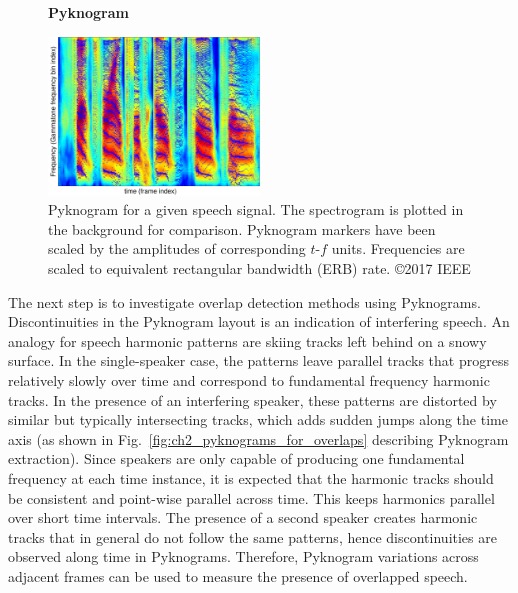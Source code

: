 {\begin{figure}[h!]
	\centering
	\vspace{4mm}
	\textbf{Pyknogram}\par\medskip
	\includegraphics[height =2.in, width=0.5\textwidth]{figures/pyknogram_vs_spectrogram}
	\vspace{-1mm}
	\caption{ Pyknogram for a given speech signal. The spectrogram is plotted in the background for comparison. Pyknogram markers have been scaled by the amplitudes of corresponding $t$-$f$ units. Frequencies are scaled to equivalent rectangular bandwidth (ERB) rate. \copyright 2017 IEEE}
	\vspace{-1mm}
	\label{fig:ch2_pyknograms}
\end{figure}

The next step is to investigate overlap detection methods using Pyknograms.
Discontinuities in the Pyknogram layout is an indication of interfering speech. 
An analogy for speech harmonic patterns are skiing tracks left behind on a snowy surface. 
In the single-speaker case, the patterns leave parallel tracks that progress relatively slowly over time and correspond to fundamental frequency harmonic tracks. 
In the presence of an interfering speaker, these patterns are distorted by similar but typically intersecting tracks, which adds sudden jumps along the time axis (as shown in Fig.~\ref{fig:ch2_pyknograms_for_overlaps} describing Pyknogram extraction). 
Since speakers are only capable of producing one fundamental frequency at each time instance, it is expected that the harmonic tracks should be consistent and point-wise parallel across time. 
This keeps harmonics parallel over short time intervals.   
The presence of a second speaker creates harmonic tracks that in general do not follow the same patterns, hence discontinuities are observed along time in Pyknograms. Therefore, Pyknogram variations across adjacent frames can be used to measure the presence of overlapped speech.

}
